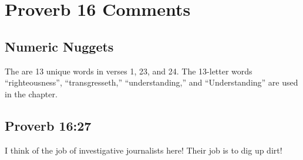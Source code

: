 \section{Proverb 16 Comments}

\subsection{Numeric Nuggets}
The are 13 unique words in verses 1, 23, and 24. The 13-letter words ``righteousness'', ``transgresseth,'' ``understanding,'' and ``Understanding'' are used in the chapter.

\subsection{Proverb 16:27}
I think of the job of investigative journalists here! Their job is to dig up dirt!